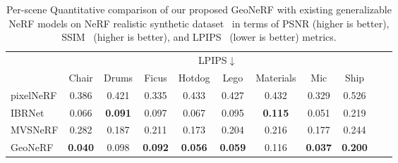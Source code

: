 \begin{table}[!t]
    \vspace{1.0ex}

    \begin{center}
        \begin{threeparttable}
            \begin{tabular}{l|cccccccccc}
            & \multicolumn{8}{c}{LPIPS$\downarrow$} \\
            &  Chair & Drums & Ficus & Hotdog & Lego & Materials & Mic & Ship \\
            \hline
            pixelNeRF & 0.386 & 0.421 & 0.335 & 0.433 & 0.427 & 0.432 & 0.329 & 0.526 \\
            IBRNet & 0.066 & \textbf{0.091} & 0.097 & 0.067 & 0.095 & \textbf{0.115} & 0.051 & 0.219 \\
            MVSNeRF & 0.282 & 0.187 & 0.211 & 0.173 & 0.204 & 0.216 & 0.177 & 0.244 \\
            GeoNeRF & \textbf{0.040} & 0.098 & \textbf{0.092} & \textbf{0.056} & \textbf{0.059} & 0.116 & \textbf{0.037} & \textbf{0.200} \\
            \hline
            \end{tabular}
        \end{threeparttable}
    \end{center}
    \vspace{3.0ex}
    \caption{Per-scene Quantitative comparison of our proposed GeoNeRF with existing generalizable NeRF models on NeRF realistic synthetic dataset~\cite{mildenhall2020nerf} in terms of PSNR (higher is better), SSIM~\cite{wang2004image} (higher is better), and LPIPS~\cite{zhang2018unreasonable} (lower is better) metrics.}
    \label{table:per_scene_no_ft_nerf}
\end{table}

\clearpage

